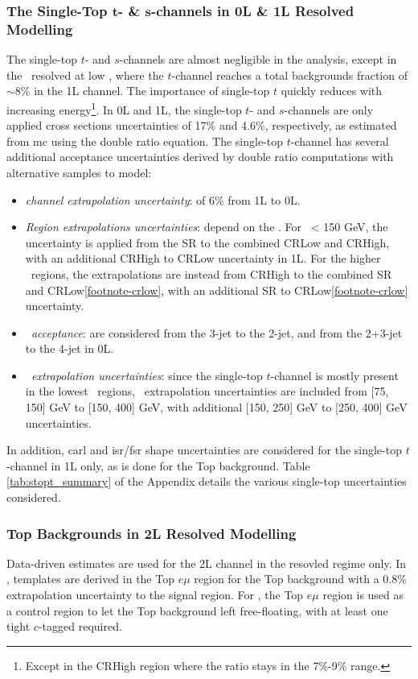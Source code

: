 \subsubsection{The Single-Top $\boldsymbol{t}$- \& $\boldsymbol{s}$-channels in 0L \& 1L Resolved Modelling}
The single-top $t$- and $s$-channels are almost negligible in the analysis, except in the \vhb\ resolved at low \ptv, where the $t$-channel reaches a total backgrounds fraction of $\sim$8\% in the 1L channel. The importance of single-top $t$ quickly reduces with increasing energy\footnote{Except in the CRHigh region where the ratio stays in the 7\%-9\% range.}. In 0L and 1L, the single-top $t$- and $s$-channels are only applied cross sections uncertainties of 17\% and 4.6\%, respectively, as estimated from \gls{mc} using the double ratio equation. The single-top $t$-channel has several additional acceptance uncertainties derived by double ratio computations with alternative samples to model: 
\begin{itemize}[leftmargin=*]
    \item \textit{channel extrapolation uncertainty}: of 6\% from 1L to 0L.
    \item \textit{Region extrapolations uncertainties}: depend on the \ptv. For \ptv\ < 150 GeV, the uncertainty is applied from the SR to the combined CRLow and CRHigh, with an additional CRHigh to CRLow uncertainty in 1L. For the higher \ptv\ regions, the extrapolations are instead from CRHigh to the combined SR and CRLow\cref{footnote-crlow}, with an additional SR to CRLow\cref{footnote-crlow} uncertainty.
    \item \textit{\nj\ acceptance}: are considered from the 3-jet to the 2-jet, and from the 2+3-jet to the 4-jet in 0L.
    \item \textit{\ptv\ extrapolation uncertainties}: since the single-top $t$-channel is mostly present in the lowest \ptv\ regions, \ptv\ extrapolation uncertainties are included from [75, 150] GeV to [150, 400] GeV, with additional [150, 250] GeV to [250, 400] GeV uncertainties.
\end{itemize}
In addition, \gls{carl} and \gls{isr}/\gls{fsr} shape uncertainties are considered for the single-top $t$-channel in 1L only, as is done for the Top background. Table \ref{tab:stopt_summary} of the Appendix details the various single-top uncertainties considered.

\subsubsection{Top Backgrounds in 2L Resolved Modelling} 
Data-driven estimates are used for the 2L channel in the resovled regime only. In \vhb, templates are derived in the Top $e\mu$ region for the Top background with a 0.8\% extrapolation uncertainty to the signal region. For \vhc, the Top $e\mu$ region is used as a control region to let the Top background left free-floating, with at least one tight $c$-tagged required.

